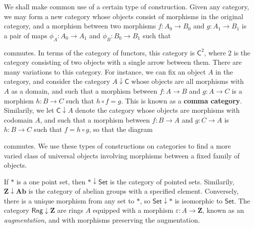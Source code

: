 We shall make common use of a certain type of construction. Given any category, we may form a new category whose objects consist of morphisms in the original category, and a morphism between two morphisms $f: A_0 \to B_0$ and $g: A_1 \to B_1$ is a pair of maps $\phi_A: A_0 \to A_1$ and $\phi_B: B_0 \to B_1$ such that
%
\begin{center}
\end{center}
%
commutes. In terms of the category of functors, this category is $\mathsf{C}^2$, where $2$ is the category consisting of two objects with a single arrow between them. There are many variations to this category. For instance, we can fix an object $A$ in the category, and consider the category $A \downarrow \mathsf{C}$ whose objects are all morphisms with $A$ as a domain, and such that a morphism between $f: A \to B$ and $g: A \to C$ is a morphism $h: B \to C$ such that $h \circ f = g$. This is known as a {\bf comma category}. Similarily, we let $\mathsf{C} \downarrow A$ denote the category whose objects are morphisms with codomain $A$, and such that a morphism between $f: B \to A$ and $g: C \to A$ is $h: B \to C$ such that $f = h \circ g$, so that the diagram
%
\begin{center}
\end{center}
%
commutes. We use these types of constructions on categories to find a more varied class of universal objects involving morphisms between a fixed family of objects.

\begin{example}
    If $*$ is a one point set, then $* \downarrow \mathsf{Set}$ is the category of pointed sets. Similarily, $\mathbf{Z} \downarrow \mathbf{Ab}$ is the category of abelian groups with a specified element. Conversely, there is a unique morphism from any set to $*$, so $\mathsf{Set} \downarrow *$ is isomorphic to $\mathsf{Set}$. The category $\mathsf{Rng} \downarrow \mathbf{Z}$ are rings $A$ equipped with a morphism $\varepsilon: A \to \mathbf{Z}$, known as an {\it augmentation}, and with morphisms preserving the augmentation.
\end{example}

